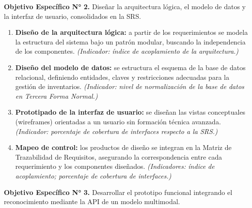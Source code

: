 \documentclass[12pt, letterpaper]{report}
\begin{document}
\noindent\textbf{Objetivo Específico N° 2.} Diseñar la arquitectura
lógica, el modelo de datos y la interfaz de usuario, consolidados en la
SRS.

\begin{enumerate}
  \item \textbf{Diseño de la arquitectura lógica:} a partir de los
        requerimientos se modela la estructura del sistema bajo un
        patrón modular, buscando la independencia de los componentes.
        \textit{(Indicador: índice de acoplamiento de la arquitectura.)}

  \item \textbf{Diseño del modelo de datos:} se estructura el esquema de
        la base de datos relacional, definiendo entidades, claves y
        restricciones adecuadas para la gestión de inventarios.
        \textit{(Indicador: nivel de normalización de la base de datos
        en Tercera Forma Normal.)}

  \item \textbf{Prototipado de la interfaz de usuario:} se diseñan las
        vistas conceptuales (wireframes) orientadas a un usuario sin
        formación técnica avanzada. \textit{(Indicador: porcentaje de
        cobertura de interfaces respecto a la SRS.)}

  \item \textbf{Mapeo de control:} los productos de diseño se integran
        en la Matriz de Trazabilidad de Requisitos, asegurando la
        correspondencia entre cada requerimiento y los componentes
        diseñados. \textit{(Indicadores: índice de acoplamiento;
        porcentaje de cobertura de interfaces.)}
\end{enumerate}

\noindent\textbf{Objetivo Específico N° 3.} Desarrollar el prototipo
funcional integrando el reconocimiento mediante la API de un modelo
multimodal.
\end{document}
